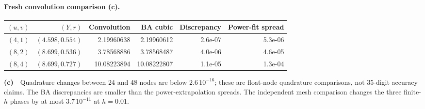 \documentclass[11pt,a4paper]{article}
\newcommand{\Lc}{\textbf{(c)}\ }
\begin{document}
\paragraph{Fresh convolution comparison (c).}
\begin{center}\small
\begin{tabular}{rrrrrr}\toprule
$(u,v)$ & $(Y,r)$ & Convolution & BA cubic & Discrepancy & Power-fit spread\\\midrule
$(4,1)$ & $(4.598,0.554)$ & 2.19960638 & 2.19960612 & 2.6e-07 & 5.3e-06\\
$(8,2)$ & $(8.699,0.536)$ & 3.78568886 & 3.78568487 & 4.0e-06 & 4.6e-05\\
$(8,4)$ & $(8.699,0.727)$ & 10.08223894 & 10.08222807 & 1.1e-05 & 1.3e-04\\
\bottomrule\end{tabular}\end{center}
\Lc\ Quadrature changes between 24 and 48 nodes are below $2.6\,10^{-16}$;
these are float-node quadrature comparisons, not 35-digit accuracy claims.
The BA discrepancies are smaller than the power-extrapolation spreads.
The independent mesh comparison changes the three finite-$h$ phases by at most
$3.7\,10^{-11}$ at $h=0.01$.
\end{document}
